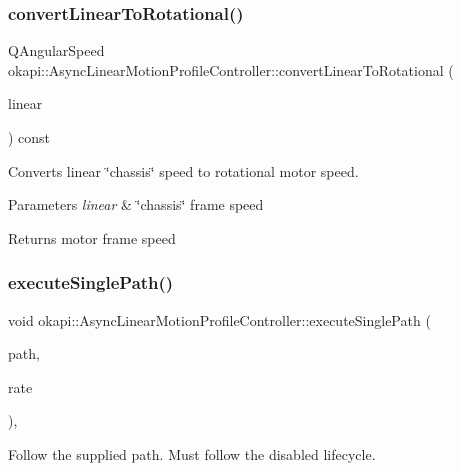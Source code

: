 \subsubsection{\texorpdfstring{convertLinearToRotational()}{convertLinearToRotational()}}
{\footnotesize\ttfamily Q\+Angular\+Speed okapi\+::\+Async\+Linear\+Motion\+Profile\+Controller\+::convert\+Linear\+To\+Rotational (\begin{DoxyParamCaption}\item[{Q\+Speed}]{linear }\end{DoxyParamCaption}) const\hspace{0.3cm}{\ttfamily [protected]}}

Converts linear \char`\"{}chassis\char`\"{} speed to rotational motor speed.


\begin{DoxyParams}{Parameters}
{\em linear} & \char`\"{}chassis\char`\"{} frame speed \\
\hline
\end{DoxyParams}
\begin{DoxyReturn}{Returns}
motor frame speed 
\end{DoxyReturn}
\mbox{\label{classokapi_1_1AsyncLinearMotionProfileController_ac9f7d18503d72627ff4b7f70d2c373bd}} 
\subsubsection{\texorpdfstring{executeSinglePath()}{executeSinglePath()}}
{\footnotesize\ttfamily void okapi\+::\+Async\+Linear\+Motion\+Profile\+Controller\+::execute\+Single\+Path (\begin{DoxyParamCaption}\item[{const \mbox{\hyperlink{structokapi_1_1AsyncLinearMotionProfileController_1_1TrajectoryPair}{Trajectory\+Pair}} \&}]{path,  }\item[{std\+::unique\+\_\+ptr$<$ \mbox{\hyperlink{classokapi_1_1AbstractRate}{Abstract\+Rate}} $>$}]{rate }\end{DoxyParamCaption})\hspace{0.3cm}{\ttfamily [protected]}, {\ttfamily [virtual]}}

Follow the supplied path. Must follow the disabled lifecycle. \mbox{\label{classokapi_1_1AsyncLinearMotionProfileController_a56b05f978f2a98c2183fdae0f13466e7}} 
